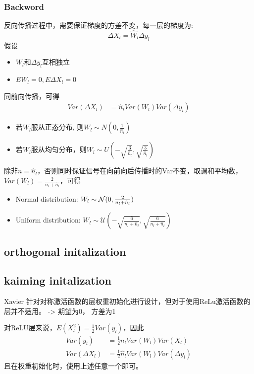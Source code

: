 \subsubsection{Backword}
反向传播过程中，需要保证梯度的方差不变，每一层的梯度为:
\begin{equation}
    \Delta X_l = \hat{W}_l \Delta y_l
\end{equation}
假设
\begin{itemize}
    \item $W_l$和$\Delta{y}_l$互相独立
    \item $EW_l = 0, E\Delta{X}_l = 0$
\end{itemize}
同前向传播，可得
\begin{equation}
    \begin{split}
        Var(\Delta{X_l}) &= \hat n_l Var(W_l)Var(\Delta{y}_l)
    \end{split}
\end{equation}
\begin{itemize}
    \item 若$W_l$服从正态分布, 则$W_l \sim N(0, \frac{1}{\hat n_l})$
    \item 若$W_l$服从均匀分布，则$W_l \sim U(-\sqrt{\frac{3}{\hat n_l}}, \sqrt{\frac{3}{\hat n_l}})$
\end{itemize}

除非$n = \hat n_l$，否则同时保证信号在向前向后传播时的Var不变，取调和平均数，$Var(W_l) = \frac{2}{n_l + \hat n_l}$，可得
\begin{itemize}
    \item Normal distribution: $W_l \sim \mathcal{N}(0, \frac{2}{n_l + \hat n_l})$
    \item Uniform distribution: $W_l \sim \mathcal{U}(-\sqrt{\frac{6}{n_l+\hat n_l}}, \sqrt{\frac{6}{n_l+\hat n_l}})$
\end{itemize}


\subsection{orthogonal initalization}

\subsection{kaiming initalization}
Xavier 针对对称激活函数的层权重初始化进行设计，但对于使用ReLu激活函数的层并不适用\cite{He2015}。
-> 期望为0， 方差为1
\par
对ReLU层来说，$E(X_l^2) = \frac{1}{2}Var(y_l)$，因此
\begin{equation}
    \begin{split}
        Var(y_l) &= \frac{1}{2} n_l Var(W_l)Var(X_l) \\
        Var(\Delta{X_l}) &= \frac{1}{2} \hat n_l Var(W_l)Var(\Delta{y}_l)
    \end{split}
\end{equation}
且在权重初始化时，使用上述任意一个即可。

